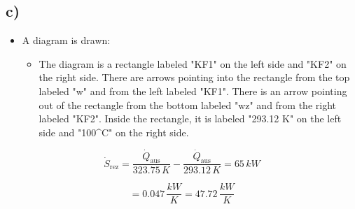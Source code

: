 

\subsection*{c)}

\begin{itemize}
    \item A diagram is drawn:
    \begin{itemize}
        \item The diagram is a rectangle labeled "KF1" on the left side and "KF2" on the right side. There are arrows pointing into the rectangle from the top labeled "w" and from the left labeled "KF1". There is an arrow pointing out of the rectangle from the bottom labeled "wz" and from the right labeled "KF2". Inside the rectangle, it is labeled "293.12 K" on the left side and "100^\circ C" on the right side.
    \end{itemize}
\end{itemize}

\begin{equation*}
\dot{S}_{\text{rez}} = \frac{\dot{Q}_{\text{aus}}}{323.75 \, K} - \frac{\dot{Q}_{\text{aus}}}{293.12 \, K} = 65 \, kW
\end{equation*}

\begin{equation*}
= 0.047 \, \frac{kW}{K} = 47.72 \, \frac{kW}{K}
\end{equation*}